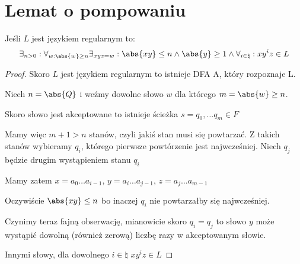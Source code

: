\section{Lemat o pompowaniu}
\begin{theorem}[O pompowaniu]
	Jeśli \( L \) jest językiem regularnym to:
	\[
		\exists_{n > 0} : \forall_{w : \abs{w} \geq n} \exists_{xyz = w} : \abs{xy} \leq n \land \abs{y} \geq 1 \land \forall_{i \in \natural} : xy^iz \in L
	\]
\end{theorem}
\begin{proof}
	Skoro \( L \) jest językiem regularnym to istnieje DFA A, który rozpoznaje L.

	Niech \( n = \abs{Q} \) i weźmy dowolne słowo \( w \) dla którego \( m = \abs{w} \geq n \).

	Skoro słowo jest akceptowane to istnieje ścieżka \( s = q_0, \dots q_m \in F \)

	Mamy więc \( m + 1 > n \) stanów, czyli jakiś stan musi się powtarzać.
	Z takich stanów wybieramy \( q_i \), którego pierwsze powtórzenie jest najwcześniej. Niech \( q_j \) będzie drugim wystąpieniem stanu \( q_i \)

	Mamy zatem \( x = a_0\dots a_{i-1} \), \( y = a_i\dots a_{j-1} \), \( z = a_j \dots a_{m-1} \)

	Oczywiście \( \abs{xy} \leq n \) bo inaczej \( q_i \) nie powtarzałby się najwcześniej.

	Czynimy teraz fajną obserwację, mianowicie skoro  \( q_i = q_j \) to słowo \( y \) może wystąpić dowolną (również zerową) liczbę razy w akceptowanym słowie.

	Innymi słowy, dla dowolnego \( i \in \natural \) \( xy^iz \in L \)
\end{proof}
